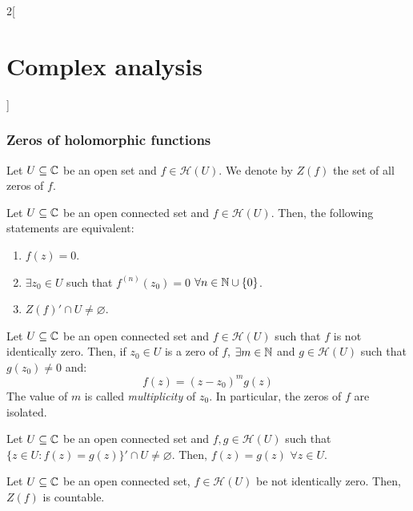 \documentclass[../../../main_math.tex]{subfiles}
\begin{document}
\begin{multicols}{2}[\section{Complex analysis}]
  \subsubsection{Zeros of holomorphic functions}
  \begin{definition}
    Let $U\subseteq\mathbb{C}$ be an open set and $f\in\mathcal{H}(U)$. We denote by $Z(f)$ the set of all zeros of $f$.
  \end{definition}
  \begin{theorem}
    Let $U\subseteq\mathbb{C}$ be an open connected set and $f\in\mathcal{H}(U)$. Then, the following statements are equivalent:
    \begin{enumerate}
      \item $f(z)=0$.
      \item $\exists z_0\in U$ such that $f^{(n)}(z_0)=0$ $\forall n\in\mathbb{N}\cup\{0\}$.
      \item ${Z(f)}'\cap U\ne\varnothing$.
    \end{enumerate}
  \end{theorem}
  \begin{corollary}
    Let $U\subseteq\mathbb{C}$ be an open connected set and $f\in\mathcal{H}(U)$ such that $f$ is not identically zero. Then, if $z_0\in U$ is a zero of $f$, $\exists m\in\mathbb{N}$ and $g\in\mathcal{H}(U)$ such that $g(z_0)\ne 0$ and: $$f(z)={(z-z_0)}^{m}g(z)$$ The value of $m$ is called \emph{multiplicity} of $z_0$. In particular, the zeros of $f$ are isolated.
  \end{corollary}
  \begin{theorem}
    Let $U\subseteq\mathbb{C}$ be an open connected set and $f,g\in\mathcal{H}(U)$ such that ${\{z\in U:f(z)=g(z)\}}'\cap U\ne\varnothing$. Then, $f(z)=g(z)$ $\forall z\in U$.
  \end{theorem}
  \begin{corollary}
    Let $U\subseteq\mathbb{C}$ be an open connected set, $f\in\mathcal{H}(U)$ be not identically zero. Then, $Z(f)$ is countable.
  \end{corollary}

\end{multicols}
\end{document}
